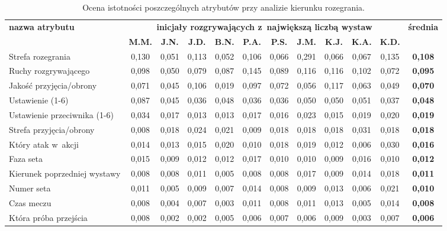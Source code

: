 \documentclass[a4paper,twoside,12pt]{book}
\begin{document}
\begin{table}
\centering
\caption{Ocena istotności poszczególnych atrybutów przy analizie kierunku rozegrania.}
\label{tab:atrybutyRKierunek}
\begin{adjustbox}{angle=90}
\begin{tabular}{|l|c|c|c|c|c|c|c|c|c|c|c|}
\hline
\multirow{2}{*}{\textbf{nazwa atrybutu}} &
\multicolumn{10}{c|}{\textbf{inicjały rozgrywających z~największą liczbą wystaw}} & 
\multirow{2}{*}{\textbf{średnia}}\\
\cline{2-11} & \textbf{M.M.} & \textbf{J.N.} & \textbf{J.D.} & \textbf{B.N.} & \textbf{P.A.} & \textbf{P.S.} & \textbf{J.M.} & \textbf{K.J.} & \textbf{K.A.} & \textbf{K.D.} &\\
\hline
 Strefa rozegrania & \cellcolor{green}0,130 & \cellcolor{green}0,051 & \cellcolor{green}0,113 & 0,052 & 0,106 & 0,066 & \cellcolor{green}0,291 & 0,066 & 0,067 & \cellcolor{green}0,135 & \textbf{0,108} \\ \hline
 Ruchy rozgrywającego & 0,098 & 0,050 & 0,079 & \cellcolor{green}0,087 & \cellcolor{green}0,145 & \cellcolor{green}0,089 & 0,116 & 0,116 & \cellcolor{green}0,102 & 0,072 & \textbf{0,095} \\ \hline
 Jakość przyjęcia/obrony & 0,071 & 0,045 & 0,106 & 0,019 & 0,097 & 0,072 & 0,056 & \cellcolor{green}0,117 & 0,063 & 0,049 & \textbf{0,070} \\ \hline
 Ustawienie (1-6) & 0,087 & 0,045 & 0,036 & 0,048 & 0,036 & 0,036 & 0,050 & 0,050 & 0,051 & 0,037 & \textbf{0,048} \\ \hline
 Ustawienie przeciwnika (1-6) & 0,034 & 0,017 & 0,013 & 0,013 & 0,017 & 0,016 & 0,023 & 0,015 & 0,019 & 0,020 & \textbf{0,019} \\ \hline
 Strefa przyjęcia/obrony & 0,008 & 0,018 & 0,024 & 0,021 & 0,009 & 0,018 & 0,018 & 0,018 & 0,031 & 0,018 & \textbf{0,018} \\ \hline
 Który atak w~akcji & 0,014 & 0,013 & 0,015 & 0,020 & 0,010 & 0,018 & 0,019 & 0,012 & 0,006 & 0,030 & \textbf{0,016} \\ \hline
 Faza seta & 0,015 & 0,009 & 0,012 & 0,012 & 0,017 & 0,010 & 0,010 & 0,009 & 0,016 & 0,010 & \textbf{0,012} \\ \hline
 Kierunek poprzedniej wystawy & 0,008 & 0,008 & 0,011 & 0,005 & 0,008 & 0,008 & 0,017 & 0,009 & 0,014 & 0,018 & \textbf{0,011} \\ \hline
 Numer seta & 0,011 & 0,005 & 0,009 & 0,007 & 0,014 & 0,008 & 0,009 & 0,013 & 0,006 & 0,021 & \textbf{0,010} \\ \hline
 Czas meczu & 0,008 & 0,004 & 0,007 & 0,003 & 0,011 & 0,008 & 0,011 & 0,013 & 0,005 & 0,014 & \textbf{0,008} \\ \hline
 Która próba przejścia & 0,008 & 0,002 & 0,002 & 0,005 & 0,006 & 0,007 & 0,006 & 0,009 & 0,003 & 0,007 & \textbf{0,006} \\ \hline
\end{tabular}
\end{adjustbox}
\end{table}
\end{document}
